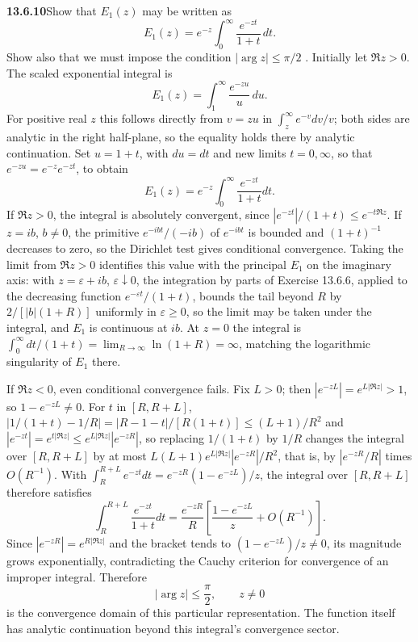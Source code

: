 \par\bigskip
\noindent\textbf{13.6.10}\quad Show that $E_{1}(z)$ may be written as
\[
E_{1}(z)=e^{-z}\int_{0}^{\infty}\frac{e^{-zt}}{1+t}\,dt.
\]
Show also that we must impose the condition $|\arg z|\le\pi/2$ .
\solution
Initially let $\Re z>0$.  The scaled exponential integral is
\[
E_1(z)=\int_1^\infty\frac{e^{-zu}}u\,du.
\]
For positive real $z$ this follows directly from $v=zu$ in
$\int_z^\infty e^{-v}dv/v$; both sides are analytic in the
right half-plane, so the equality holds there by analytic
continuation.  Set $u=1+t$, with $du=dt$ and new limits
$t=0,\infty$, so that $e^{-zu}=e^{-z}e^{-zt}$, to obtain
\[
\boxed{E_1(z)=e^{-z}\int_0^\infty\frac{e^{-zt}}{1+t}dt}.
\]
If $\Re z>0$, the integral is absolutely convergent, since
$|e^{-zt}|/(1+t)\le e^{-t\Re z}$.  If
$z=ib$, $b\ne0$, the primitive $e^{-ibt}/(-ib)$ of $e^{-ibt}$ is
bounded and $(1+t)^{-1}$ decreases to zero, so the Dirichlet test
gives conditional convergence.  Taking the limit from $\Re z>0$
identifies this value with the principal $E_1$ on the imaginary
axis: with $z=\varepsilon+ib$, $\varepsilon\downarrow0$, the
integration by parts of Exercise 13.6.6, applied to the decreasing
function $e^{-\varepsilon t}/(1+t)$, bounds the tail beyond $R$ by
$2/[|b|(1+R)]$ uniformly in $\varepsilon\ge0$, so the limit may be
taken under the integral, and $E_1$ is continuous at $ib$.
At $z=0$ the integral is $\int_0^\infty dt/(1+t)
=\lim_{R\to\infty}\ln(1+R)=\infty$, matching the logarithmic
singularity of $E_1$ there.

If $\Re z<0$, even conditional convergence fails.  Fix $L>0$;
then $|e^{-zL}|=e^{L|\Re z|}>1$, so $1-e^{-zL}\ne0$.  For $t$ in
$[R,R+L]$,
$|1/(1+t)-1/R|=|R-1-t|/[R(1+t)]\le(L+1)/R^2$ and
$|e^{-zt}|=e^{t|\Re z|}\le e^{L|\Re z|}|e^{-zR}|$, so replacing
$1/(1+t)$ by $1/R$ changes the integral over $[R,R+L]$ by at most
$L(L+1)e^{L|\Re z|}|e^{-zR}|/R^2$, that is, by $|e^{-zR}/R|$ times
$O(R^{-1})$.  With $\int_R^{R+L}e^{-zt}dt=e^{-zR}(1-e^{-zL})/z$,
the integral over $[R,R+L]$ therefore satisfies
\[
\int_R^{R+L}\frac{e^{-zt}}{1+t}dt
=\frac{e^{-zR}}R\left[\frac{1-e^{-zL}}z+O(R^{-1})\right].
\]
Since $|e^{-zR}|=e^{R|\Re z|}$ and the bracket tends to
$(1-e^{-zL})/z\ne0$, its magnitude grows exponentially,
contradicting the Cauchy
criterion for convergence of an improper integral.  Therefore
\[
\boxed{|\arg z|\le\frac\pi2,\qquad z\ne0}
\]
is the convergence domain of this particular representation.
The function itself has analytic continuation beyond this
integral's convergence sector.


